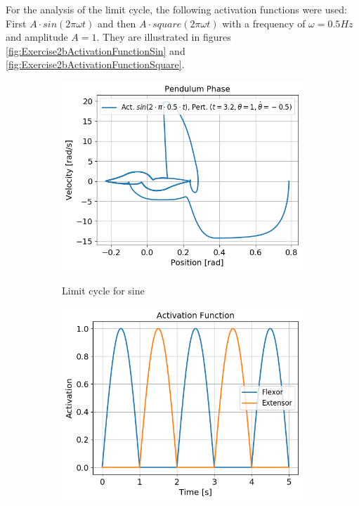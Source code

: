 \documentclass{cmc}
\begin{document}
For the analysis of the limit cycle, the following activation functions were used: First $A\cdot{}sin(2\pi\omega t)$ and then $A\cdot{}square(2\pi\omega t)$ with a frequency of $\omega = 0.5 Hz$ and amplitude $A = 1$. They are illustrated in figures \ref{fig:Exercise2bActivationFunctionSin} and \ref{fig:Exercise2bActivationFunctionSquare}.
\begin{figure}[H]
  \centering
  \begin{subfigure}[b]{0.49\textwidth}
    { \centering
      \includegraphics[width=\textwidth]{figures/2b_LimitCycle_sin.png} }
    \caption{Limit cycle for sine}
    \label{fig:Exercise2bLimitCycleSin}
  \end{subfigure}
  \begin{subfigure}[b]{0.49\textwidth}
    { \centering
      \includegraphics[width=\textwidth]{figures/2b_ActivationFunction_sin.png} }

\end{subfigure}
\end{figure}
\end{document}
